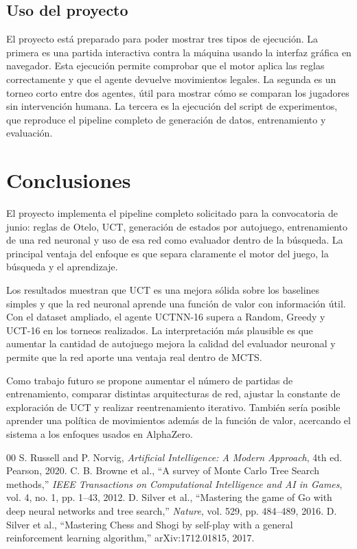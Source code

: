 \documentclass[conference,a4paper]{IEEEtran}
\begin{document}
\subsection{Uso del proyecto}

El proyecto está preparado para poder mostrar tres tipos de ejecución. La
primera es una partida interactiva contra la máquina usando la interfaz gráfica
en navegador. Esta ejecución permite comprobar que el motor aplica las reglas
correctamente y que el agente devuelve movimientos legales. La segunda es un
torneo corto entre dos agentes, útil para mostrar cómo se comparan los jugadores
sin intervención humana. La tercera es la ejecución del script de experimentos,
que reproduce el pipeline completo de generación de datos, entrenamiento y
evaluación.

\section{Conclusiones}

El proyecto implementa el pipeline completo solicitado para la convocatoria de
junio: reglas de Otelo, UCT, generación de estados por autojuego, entrenamiento
de una red neuronal y uso de esa red como evaluador dentro de la búsqueda. La
principal ventaja del enfoque es que separa claramente el motor del juego, la
búsqueda y el aprendizaje.

Los resultados muestran que UCT es una mejora sólida sobre los baselines simples
y que la red neuronal aprende una función de valor con información útil. Con el
dataset ampliado, el agente UCTNN-16 supera a Random, Greedy y UCT-16 en los
torneos realizados. La interpretación más plausible es que aumentar la cantidad
de autojuego mejora la calidad del evaluador neuronal y permite que la red aporte
una ventaja real dentro de MCTS.

Como trabajo futuro se propone aumentar el número de partidas de entrenamiento,
comparar distintas arquitecturas de red, ajustar la constante de exploración de
UCT y realizar reentrenamiento iterativo. También sería posible aprender una
política de movimientos además de la función de valor, acercando el sistema a
los enfoques usados en AlphaZero.

\begin{thebibliography}{00}
 S. Russell and P. Norvig, \emph{Artificial Intelligence:
A Modern Approach}, 4th ed. Pearson, 2020.
 C. B. Browne et al., ``A survey of Monte Carlo Tree Search
methods,'' \emph{IEEE Transactions on Computational Intelligence and AI in
Games}, vol. 4, no. 1, pp. 1--43, 2012.
 D. Silver et al., ``Mastering the game of Go with deep
neural networks and tree search,'' \emph{Nature}, vol. 529, pp. 484--489, 2016.
 D. Silver et al., ``Mastering Chess and Shogi by self-play
with a general reinforcement learning algorithm,'' arXiv:1712.01815, 2017.
\end{thebibliography}
\end{document}
